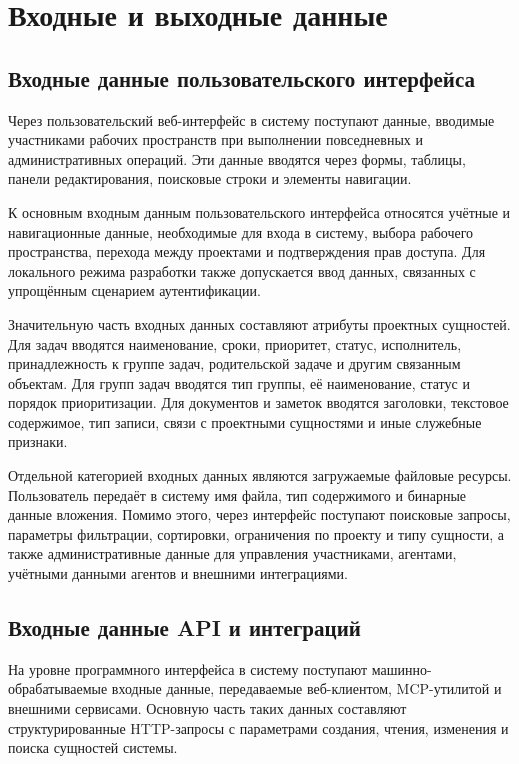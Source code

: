 \section{Входные и выходные данные}

\subsection{Входные данные пользовательского интерфейса}

\headingtextsep

Через пользовательский веб-интерфейс в систему поступают данные, вводимые участниками рабочих пространств при выполнении повседневных и административных операций. Эти данные вводятся через формы, таблицы, панели редактирования, поисковые строки и элементы навигации.

К основным входным данным пользовательского интерфейса относятся учётные и навигационные данные, необходимые для входа в систему, выбора рабочего пространства, перехода между проектами и подтверждения прав доступа. Для локального режима разработки также допускается ввод данных, связанных с упрощённым сценарием аутентификации.

Значительную часть входных данных составляют атрибуты проектных сущностей. Для задач вводятся наименование, сроки, приоритет, статус, исполнитель, принадлежность к группе задач, родительской задаче и другим связанным объектам. Для групп задач вводятся тип группы, её наименование, статус и порядок приоритизации. Для документов и заметок вводятся заголовки, текстовое содержимое, тип записи, связи с проектными сущностями и иные служебные признаки.

Отдельной категорией входных данных являются загружаемые файловые ресурсы. Пользователь передаёт в систему имя файла, тип содержимого и бинарные данные вложения. Помимо этого, через интерфейс поступают поисковые запросы, параметры фильтрации, сортировки, ограничения по проекту и типу сущности, а также административные данные для управления участниками, агентами, учётными данными агентов и внешними интеграциями.

\textheadingsep
\subsection{Входные данные API и интеграций}

\headingtextsep

На уровне программного интерфейса в систему поступают машинно-обрабатываемые входные данные, передаваемые веб-клиентом, MCP-утилитой и внешними сервисами. Основную часть таких данных составляют структурированные HTTP-запросы с параметрами создания, чтения, изменения и поиска сущностей системы.

